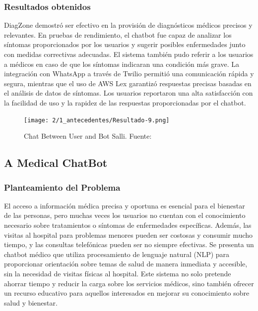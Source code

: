 \subsubsection{Resultados obtenidos}
	DiagZone demostró ser efectivo en la provisión de diagnósticos médicos precisos y relevantes. En pruebas de rendimiento, el chatbot fue capaz de analizar los síntomas proporcionados por los usuarios y sugerir posibles enfermedades junto con medidas correctivas adecuadas. El sistema también pudo referir a los usuarios a médicos en caso de que los síntomas indicaran una condición más grave. La integración con WhatsApp a través de Twilio permitió una comunicación rápida y segura, mientras que el uso de AWS Lex garantizó respuestas precisas basadas en el análisis de datos de síntomas. Los usuarios reportaron una alta satisfacción con la facilidad de uso y la rapidez de las respuestas proporcionadas por el chatbot.

\begin{figure}[H]
	\begin{center}
		\texttt{[image: 2/1\_antecedentes/Resultado-9.png]}
		\caption{Chat Between User and Bot Salli. Fuente: \cite{ApproachtoMedical} }
	\end{center}
\end{figure}
\vspace{-10mm}

\subsection{A Medical ChatBot \citep*{MedicalChatBot}} 

\subsubsection{Planteamiento del Problema}
	El acceso a información médica precisa y oportuna es esencial para el bienestar de las personas, pero muchas veces los usuarios no cuentan con el conocimiento necesario sobre tratamientos o síntomas de enfermedades específicas. Además, las visitas al hospital para problemas menores pueden ser costosas y consumir mucho tiempo, y las consultas telefónicas pueden ser no siempre efectivas. Se presenta un chatbot médico que utiliza procesamiento de lenguaje natural (NLP) para proporcionar orientación sobre temas de salud de manera inmediata y accesible, sin la necesidad de visitas físicas al hospital. Este sistema no solo pretende ahorrar tiempo y reducir la carga sobre los servicios médicos, sino también ofrecer un recurso educativo para aquellos interesados en mejorar su conocimiento sobre salud y bienestar. 

